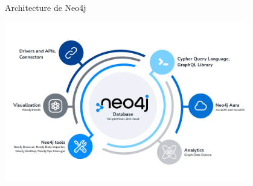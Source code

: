 

\begin{frame}{ Architecture de Neo4j}
 
    \begin{center}
    \colorbox{white}{\includegraphics[width=0.8\textwidth]{img/Achitecturee.jpg}}
\end{center}


 
\end{frame}